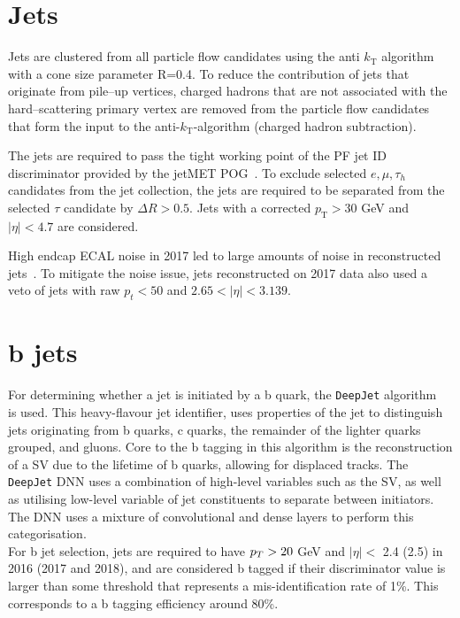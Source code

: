 \section{Jets}

Jets are clustered from all particle flow  candidates using the anti $k_{\text{T}}$ algorithm~\cite{Cacciari:2011ma} with a cone size parameter R=0.4. 
To reduce the contribution of jets that originate from pile--up vertices, charged hadrons that are not associated with the hard--scattering primary vertex are removed from the particle flow candidates 
that form the input to the anti-$k_{\text{T}}$-algorithm (charged hadron subtraction).

The jets are required to pass the tight working point of
the PF jet ID discriminator provided by the jetMET POG~\cite{PFJetID}.  
To exclude selected $e,\mu,\tau_{h}$ candidates from the jet collection, the jets
are required to be separated from the selected $\tau$ candidate by $\Delta R
> 0.5$.  Jets with a corrected $p_{\text{T}} > 30$ GeV and $|\eta|<4.7$ are
considered.

High endcap ECAL noise in 2017 led to large amounts of noise in reconstructed jets~\cite{JetTwiki}. To mitigate the noise issue,
jets reconstructed on 2017 data also used a veto of jets with
raw $p_{t} < 50$ and $2.65 < |\eta| < 3.139$. 

\section{b jets}

For determining whether a jet is initiated by a b quark, the \texttt{DeepJet} algorithm~\cite{CMS:2017wtu,Bols:2020bkb} is used.  
This heavy-flavour jet identifier, uses properties of the jet to distinguish jets originating from b quarks, c quarks, the remainder of the lighter quarks grouped, and gluons.
Core to the b tagging in this algorithm is the reconstruction of a \ac{SV} due to the lifetime of b quarks, allowing for displaced tracks.
The \texttt{DeepJet} \ac{DNN} uses a combination of high-level variables such as the \ac{SV}, as well as utilising low-level variable of jet constituents to separate between initiators.
The \ac{DNN} uses a mixture of convolutional and dense layers to perform this categorisation. \\

For b jet selection, jets are required to have $p_{T} > 20$ GeV and $|\eta| <$ 2.4 (2.5) in 2016 (2017 and 2018), and are considered b tagged if their discriminator value is larger than some threshold that represents a mis-identification rate of 1\%.
This corresponds to a b tagging efficiency around 80\%.

